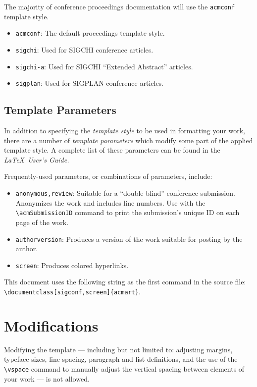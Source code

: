 \documentclass[sigplan,screen,anonymous]{acmart}
\begin{document}
The majority of conference proceedings documentation will use the {\verb|acmconf|} template style.
\begin{itemize}
\item {\verb|acmconf|}: The default proceedings template style.
\item{\verb|sigchi|}: Used for SIGCHI conference articles.
\item{\verb|sigchi-a|}: Used for SIGCHI ``Extended Abstract'' articles.
\item{\verb|sigplan|}: Used for SIGPLAN conference articles.
\end{itemize}

\subsection{Template Parameters}

In addition to specifying the {\it template style} to be used in formatting your work, there are a number of {\it template parameters} which modify some part of the applied template style. A complete list of these parameters can be found in the {\it \LaTeX\ User's Guide.}

Frequently-used parameters, or combinations of parameters, include:
\begin{itemize}
\item {\verb|anonymous,review|}: Suitable for a ``double-blind'' conference submission. Anonymizes the work and includes line numbers. Use with the \verb|\acmSubmissionID| command to print the submission's unique ID on each page of the work.
\item{\verb|authorversion|}: Produces a version of the work suitable for posting by the author.
\item{\verb|screen|}: Produces colored hyperlinks.
\end{itemize}

This document uses the following string as the first command in the source file: \verb|\documentclass[sigconf,screen]{acmart}|.

\section{Modifications}

Modifying the template --- including but not limited to: adjusting margins, typeface sizes, line spacing, paragraph and list definitions, and the use of the \verb|\vspace| command to manually adjust the vertical spacing between elements of your work --- is not allowed.
\end{document}
